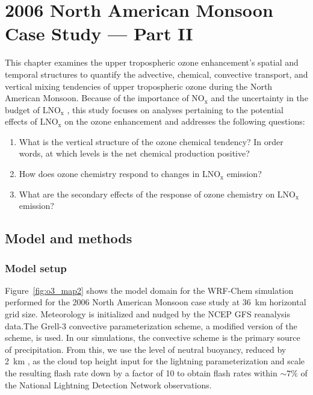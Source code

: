 \chapter{2006 North American Monsoon Case Study --- Part II} \label{ch:2006_5}
\ifpdf
    \graphicspath{{Chapter_2006/figures/PNG/}{Chapter_2006/figures/PDF/}{Chapter_2006/}}
\else
    \graphicspath{{Chapter_2006/figures/EPS/}{Chapter_2006/}}
\fi

This chapter examines the upper tropospheric ozone enhancement's spatial and
temporal structures to quantify the advective, chemical, convective transport, and vertical
mixing tendencies of upper tropospheric ozone during the North American Monsoon.
Because of the importance of $\mathrm{NO_x}$ \citep{Cooper:2009nx}
and the uncertainty in the budget of $\mathrm{LNO_x}$ \citep{Schumann:2007fk}, this study focuses
on analyses pertaining to the potential effects of $\mathrm{LNO_x}$
on the ozone enhancement and addresses the following questions:
\begin{enumerate}
\item What is the vertical structure of the ozone chemical tendency? In order words,
at which levels is the net chemical production positive?
\item How does ozone chemistry respond to changes in $\mathrm{LNO_x}$ emission?
\item What are the secondary effects of the response of ozone chemistry on $\mathrm{LNO_x}$ emission?
\end{enumerate}

\section{Model and methods}\label{sect:model}

\subsection{Model setup}

Figure~\ref{fig:o3_map2} shows the model domain for the WRF-Chem simulation performed
for the 2006 North American Monsoon case study at 36~km horizontal grid size. Meteorology
is initialized and nudged by the NCEP GFS reanalysis data.The Grell-3 convective
parameterization scheme, a modified version of the \citet{Grell:2002bs} scheme, is used.
In our simulations, the convective scheme is the primary source of precipitation.
From this, we use the level of neutral buoyancy, reduced by 2~km \citep{Wong:2013vn},
as the cloud top height input for the
\citet{Price:1992wb} lightning parameterization and scale the resulting flash rate down by a factor of 10 to obtain flash rates within $\sim7\%$ of
the National Lightning Detection Network \citep[NLDN;][]{Cummins:2009aa} observations.

